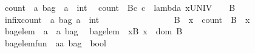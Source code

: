 \begin{isabellebody}
\isanewline
\ \ count\ {\isacharcolon}{\isacharcolon}\ {\isachardoublequoteopen}{\isacharprime}a\ bag\ {\isacharless}{\isacharequal}{\isachargreater}\ {\isacharparenleft}{\isacharprime}a\ {\isacharless}{\isacharequal}{\isachargreater}\ int{\isacharparenright}{\isachardoublequoteclose}\isanewline
\ \ {\isachardoublequoteopen}count\ {\isacharequal}{\isacharequal}\ {\isacharbraceleft}{\isacharparenleft}B{\isacharcomma}c{\isacharparenright}{\isachardot}\ c\ {\isacharequal}\ {\isacharparenleft}{\isacharparenleft}lambda\ x{\isacharcolon}UNIV\ {\isachardot}\ {}{\isacharparenright}\ {\isacharparenleft}{\isacharplus}{\isacharparenright}\ B{\isacharparenright}{\isacharbraceright}{\isachardoublequoteclose}\isanewline
\isanewline
\ \ infixcount\ {\isacharcolon}{\isacharcolon}\ {\isachardoublequoteopen}{\isacharbrackleft}{\isacharprime}a\ bag{\isacharcomma}\ {\isacharprime}a{\isacharbrackright}\ {\isacharequal}{\isachargreater}\ int{\isachardoublequoteclose}\ \ \ \ \ \ \ \ \ \ \ \ {\isacharparenleft}{\isachardoublequoteopen}{\isacharparenleft}{\isacharunderscore}\ {\isacharbrackleft}{\isacharhash}{\isacharbrackright}{\isacharslash}\ {\isacharunderscore}{\isacharparenright}{\isachardoublequoteclose}\ {\isacharbrackleft}{}{}{\isacharcomma}{}{}{\isacharbrackright}{}{}{\isacharparenright}\isanewline
\ \ {\isachardoublequoteopen}B\ {\isacharbrackleft}{\isacharhash}{\isacharbrackright}\ x\ {\isacharequal}{\isacharequal}\ count\ {\isacharpercent}{\isacharcircum}\ B\ {\isacharpercent}{\isacharcircum}\ x{\isachardoublequoteclose}\isanewline
\isanewline
\ \ bagelem\ {\isacharcolon}{\isacharcolon}\ {\isachardoublequoteopen}{\isacharprime}a\ {\isacharless}{\isacharequal}{\isachargreater}\ {\isacharparenleft}{\isacharprime}a\ bag{\isacharparenright}{\isachardoublequoteclose}\isanewline
\ \ {\isachardoublequoteopen}bagelem\ {\isacharequal}{\isacharequal}\ {\isacharbraceleft}{\isacharparenleft}x{\isacharcomma}B{\isacharparenright}{\isachardot}\ x\ {\isacharcolon}\ dom\ B{\isacharbraceright}{\isachardoublequoteclose}\isanewline
\isanewline
\ \ bagelem{\isacharunderscore}fun\ {\isacharcolon}{\isacharcolon}\ {\isachardoublequoteopen}{\isacharbrackleft}{\isacharprime}a{\isacharcomma}{\isacharprime}a\ bag{\isacharbrackright}\ {\isacharequal}{\isachargreater}\ bool{\isachardoublequoteclose}\ \ \ \ \ \ \ \ \ \ \ {\isacharparenleft}{\isachardoublequoteopen}{\isacharparenleft}{\isacharunderscore}\ {\isacharbrackleft}{\isacharcolon}{\isacharslash}\ {\isacharunderscore}{\isacharparenright}{\isachardoublequoteclose}\ \ {\isacharbrackleft}{}{}{\isacharcomma}{}{}{\isacharbrackright}{}{}{\isacharparenright}\isanewline

\end{isabellebody}
